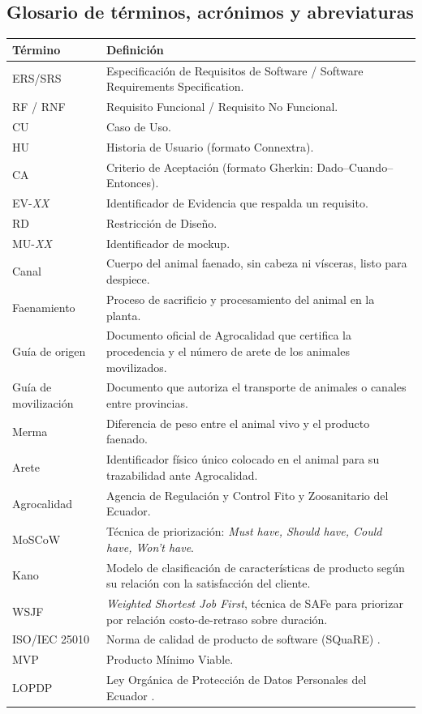 \documentclass[11pt,a4paper]{article}
\begin{document}
\subsection{Glosario de términos, acrónimos y abreviaturas}
\begin{longtable}{|p{4cm}|p{11cm}|}
\hline
\textbf{Término} & \textbf{Definición} \\
\hline
ERS/SRS & Especificación de Requisitos de Software / Software Requirements Specification. \\
RF / RNF & Requisito Funcional / Requisito No Funcional. \\
CU & Caso de Uso. \\
HU & Historia de Usuario (formato Connextra). \\
CA & Criterio de Aceptación (formato Gherkin: Dado--Cuando--Entonces). \\
EV-\textit{XX} & Identificador de Evidencia que respalda un requisito. \\
RD & Restricción de Diseño. \\
MU-\textit{XX} & Identificador de mockup. \\
Canal & Cuerpo del animal faenado, sin cabeza ni vísceras, listo para despiece. \\
Faenamiento & Proceso de sacrificio y procesamiento del animal en la planta. \\
Guía de origen & Documento oficial de Agrocalidad que certifica la procedencia y el número de arete de los animales movilizados. \\
Guía de movilización & Documento que autoriza el transporte de animales o canales entre provincias. \\
Merma & Diferencia de peso entre el animal vivo y el producto faenado. \\
Arete & Identificador físico único colocado en el animal para su trazabilidad ante Agrocalidad. \\
Agrocalidad & Agencia de Regulación y Control Fito y Zoosanitario del Ecuador. \\
MoSCoW & Técnica de priorización: \textit{Must have, Should have, Could have, Won't have}. \\
Kano & Modelo de clasificación de características de producto según su relación con la satisfacción del cliente. \\
WSJF & \textit{Weighted Shortest Job First}, técnica de SAFe para priorizar por relación costo-de-retraso sobre duración. \\
ISO/IEC 25010 & Norma de calidad de producto de software (SQuaRE) \cite{iso25010}. \\
MVP & Producto Mínimo Viable. \\
LOPDP & Ley Orgánica de Protección de Datos Personales del Ecuador \cite{lopd2021}. \\
\hline
\end{longtable}
\end{document}
